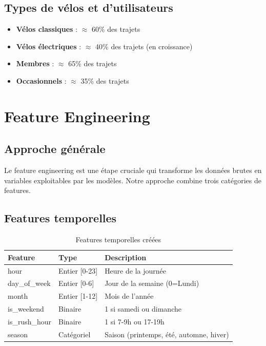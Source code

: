 \documentclass[12pt,a4paper]{article}
\begin{document}
\subsection{Types de vélos et d'utilisateurs}

\begin{itemize}
    \item \textbf{Vélos classiques} : $\approx$ 60\% des trajets
    \item \textbf{Vélos électriques} : $\approx$ 40\% des trajets (en croissance)
    \item \textbf{Membres} : $\approx$ 65\% des trajets
    \item \textbf{Occasionnels} : $\approx$ 35\% des trajets
\end{itemize}

\section{Feature Engineering}

\subsection{Approche générale}

Le feature engineering est une étape cruciale qui transforme les données brutes en variables exploitables par les modèles. Notre approche combine trois catégories de features.

\subsection{Features temporelles}

\begin{table}[H]
\centering
\caption{Features temporelles créées}
\label{tab:temporal_features}
\begin{tabular}{llp{6cm}}
\toprule
\textbf{Feature} & \textbf{Type} & \textbf{Description} \\
\midrule
hour & Entier [0-23] & Heure de la journée \\
day\_of\_week & Entier [0-6] & Jour de la semaine (0=Lundi) \\
month & Entier [1-12] & Mois de l'année \\
is\_weekend & Binaire & 1 si samedi ou dimanche \\
is\_rush\_hour & Binaire & 1 si 7-9h ou 17-19h \\
season & Catégoriel & Saison (printemps, été, automne, hiver) \\
\bottomrule
\end{tabular}
\end{table}
\end{document}
